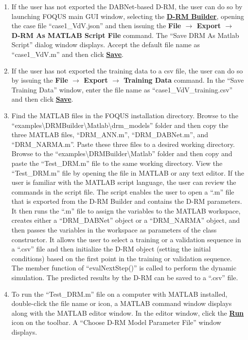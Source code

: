 \begin{enumerate}
	\item If the user has not exported the DABNet-based D-RM, the user can do so by launching FOQUS main GUI window, selecting the \textbf{\underline{D-RM Builder}}, opening the case file ``case1\_VdV.json'' and then issuing the \textbf{File $\rightarrow$ Export $\rightarrow$ D-RM As MATLAB Script File} command.  The ``Save DRM As Matlab Script'' dialog window displays.  Accept the default file name as ``case1\_VdV.m'' and then click \textbf{\underline{Save}}.
	\item If the user has not exported the training data to a csv file, the user can do so by issuing the \textbf{File $\rightarrow$ Export $\rightarrow$ Training Data} command.  In the ``Save Training Data'' window, enter the file name as ``case1\_VdV\_training.csv'' and then click \textbf{\underline{Save}}.
	\item Find the MATLAB files in the FOQUS installation directory.  Browse to the\\ ``examples\textbackslash DRMBuilder\textbackslash Matlab\textbackslash drm\_models'' folder and then copy the three MATLAB files, ``DRM\_ANN.m'', ``DRM\_DABNet.m'', and ``DRM\_NARMA.m''.  Paste these three files to a desired working directory.  Browse to the ``examples\textbackslash DRMBuilder\textbackslash Matlab'' folder and then copy and paste the ``Test\_DRM.m'' file to the same working directory.  View the ``Test\_DRM.m'' file by opening the file in MATLAB or any text editor.  If the user is familiar with the MATLAB script language, the user can review the commands in the script file.  The script enables the user to open a ``.m'' file that is exported from the D-RM Builder and contains the D-RM parameters.  It then runs the ``.m'' file to assign the variables to the MATLAB workspace, creates either a ``DRM\_DABNet'' object or a ``DRM\_NARMA'' object, and then passes the variables in the workspace as parameters of the class constructor.  It allows the user to select a training or a validation sequence in a ``.csv'' file and then initialize the D-RM object (setting the initial conditions) based on the first point in the training or validation sequence.  The member function of ``evalNextStep()'' is called to perform the dynamic simulation.  The predicted results by the D-RM can be saved to a ``.csv'' file.
	\item To run the ``Test\_DRM.m'' file on a computer with MATLAB installed, double-click the file name or icon, a MATLAB command window displays along with the MATLAB editor window.  In the editor window, click the \textbf{\underline{Run}} icon on the toolbar.  A ``Choose D-RM Model Parameter File'' window displays.

\end{enumerate}
